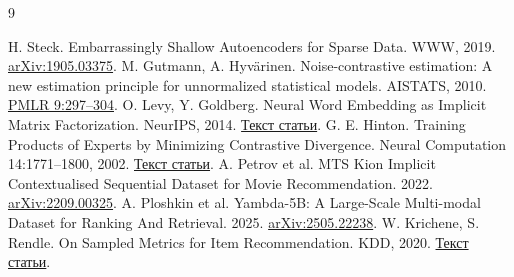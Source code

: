 \documentclass[10pt,a4paper,twocolumn]{article}
\begin{document}
\balance
\begin{thebibliography}{9}
\fontsize{8}{9.5}\selectfont\raggedright{}\setlength{\itemsep}{1pt}\setlength{\parskip}{0pt}
 H. Steck. Embarrassingly Shallow Autoencoders for Sparse Data.
WWW, 2019. \href{https://arxiv.org/abs/1905.03375}{arXiv:1905.03375}.
 M. Gutmann, A. Hyv\"arinen. Noise-contrastive estimation: A new
estimation principle for unnormalized statistical models. AISTATS, 2010.
\href{https://proceedings.mlr.press/v9/gutmann10a.html}{PMLR 9:297--304}.
 O. Levy, Y. Goldberg. Neural Word Embedding as Implicit Matrix
Factorization. NeurIPS, 2014.
\href{https://proceedings.neurips.cc/paper_files/paper/2014/file/b78666971ceae55a8e87efb7cbfd9ad4-Paper.pdf}{Текст статьи}.
 G. E. Hinton. Training Products of Experts by Minimizing Contrastive
Divergence. Neural Computation 14:1771--1800, 2002.
\href{https://www.cs.toronto.edu/~hinton/absps/nccd.pdf}{Текст статьи}.
 A. Petrov et al. MTS Kion Implicit Contextualised Sequential Dataset
for Movie Recommendation. 2022. \href{https://arxiv.org/abs/2209.00325}{arXiv:2209.00325}.
 A. Ploshkin et al. Yambda-5B: A Large-Scale Multi-modal Dataset
for Ranking And Retrieval. 2025. \href{https://arxiv.org/abs/2505.22238}{arXiv:2505.22238}.
 W. Krichene, S. Rendle. On Sampled Metrics for Item Recommendation.
KDD, 2020. \href{https://research.google/pubs/on-sampled-metrics-for-item-recommendation/}{Текст статьи}.
\end{thebibliography}
\end{document}
